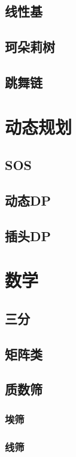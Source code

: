 \documentclass[twocolumn,a4]{article}
\newcommand{\addcpp}[1]{}
\begin{document}
	\subsection{线性基}
		\addcpp{datastruct/linear_base}
	\subsection{珂朵莉树}
		\addcpp{datastruct/chtholly}
	\subsection{跳舞链}

\section{动态规划}
	\subsection{SOS}
		\addcpp{dp/SOS}
	\subsection{动态DP}
	\subsection{插头DP}

\section{数学}
	\subsection{三分}
		\addcpp{math/tripartition}
	\subsection{矩阵类}
	\subsection{质数筛}
		\subsubsection{埃筛}
		\subsubsection{线筛}
\end{document}

